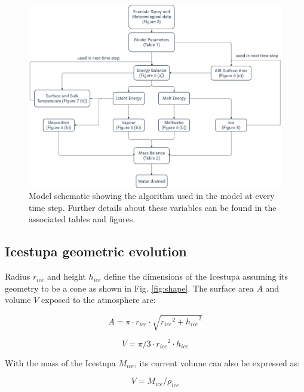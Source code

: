 \documentclass[utf8]{frontiersSCNS} %
\begin{document}
  \begin{figure} \begin{center} \includegraphics[width=15 cm]{Figures/Figure_4.jpg} \end{center} \caption{Model
schematic showing the algorithm used in the model at every time step. Further details about these variables can be
found in the associated tables and figures.} \label{fig:schema} \end{figure}
\subsection{Icestupa geometric evolution}

Radius $r_{ice}$ and height $h_{ice}$ define the dimensions of the Icestupa assuming its geometry to be a cone as
shown in Fig. \ref{fig:shape}. The surface area $A$ and volume $V$ exposed to the atmosphere are:

\begin{equation} A = \pi \cdot r_{ice} \cdot \sqrt{{r_{ice}}^2 + {h_{ice}}^ 2} \label{eqn:A} \end{equation}

\begin{equation} V = \pi/3 \cdot {r_{ice}}^2 \cdot h_{ice} \label{eqn:V} \end{equation}

With the mass of the Icestupa $M_{ice}$, its current volume can also be expressed as:

\begin{equation} V = M_{ice} / \rho_{ice} \label{eqn:V1} \end{equation}
\end{document}
